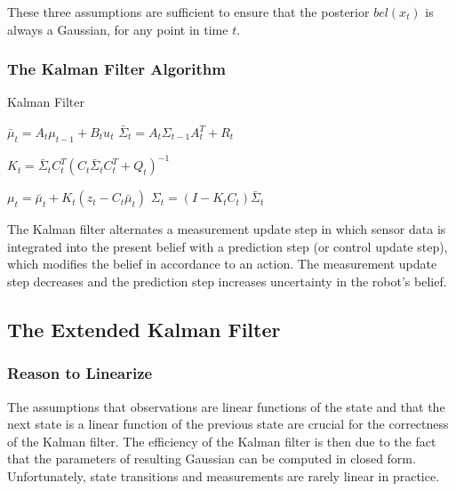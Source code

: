 These three assumptions are sufficient to ensure that the posterior $bel(x_t)$ is always a Gaussian, for any point in time $t$.

\subsubsection{The Kalman Filter Algorithm}

\begin{algorithm}[H]
\caption{Kalman Filter}

\BlankLine
{}
$\bar{\mu}_t = A_t \mu_{t-1} + B_t u_t$\;
$\bar{\Sigma}_t = A_t \Sigma_{t-1} A_t^T + R_t$\;

\BlankLine
{}
$K_t = \bar{\Sigma}_t C_t^T (C_t \bar{\Sigma}_t C_t^T + Q_t)^{-1}$\;

\BlankLine
{}
$\mu_t = \bar{\mu}_t + K_t (z_t - C_t \bar{\mu}_t)$\;
$\Sigma_t = (I - K_tC_t)\bar{\Sigma}_t$\;

\BlankLine
{}
\end{algorithm}

\vspace{2mm}

The Kalman filter alternates a measurement update step in which sensor data is integrated into the present belief with a prediction step (or control update step), which modifies the belief in accordance to an action.
The measurement update step decreases and the prediction step increases uncertainty in the robot's belief.

\subsection{The Extended Kalman Filter}

\subsubsection{Reason to Linearize}

The assumptions that observations are linear functions of the state and that the next state is a linear function of the previous state are crucial for the correctness of the Kalman filter.
The efficiency of the Kalman filter is then due to the fact that the parameters of resulting Gaussian can be computed in closed form.
Unfortunately, state transitions and measurements are rarely linear in practice.

